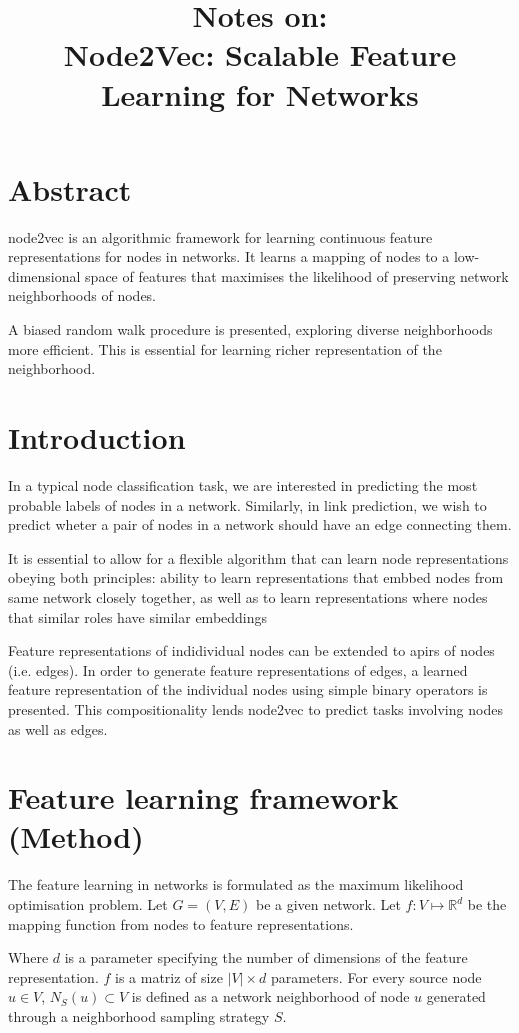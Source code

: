\documentclass{article}
\title{\textbf{Notes on:}\\ Node2Vec: Scalable Feature Learning for Networks}
\begin{document}
\maketitle{}

\section{Abstract}
node2vec is an algorithmic framework for learning continuous feature
representations for nodes in networks. It learns a mapping of nodes to a
low-dimensional space of features that maximises the likelihood of preserving
network neighborhoods of nodes.

A biased random walk procedure is presented, exploring diverse neighborhoods
more efficient. This is essential for learning richer representation of the
neighborhood.


\section{Introduction}
In a typical node classification task, we are interested in predicting the most
probable labels of nodes in a network. Similarly, in link prediction, we wish
to predict wheter a pair of nodes in a network should have an edge connecting
them.

It is essential to allow for a flexible algorithm that can learn node
representations obeying both principles: ability to learn representations that
embbed nodes from same network closely together, as well as to learn
representations where nodes that similar roles have similar embeddings

Feature representations of indidividual nodes can be extended to apirs of nodes
(i.e. edges). In order to generate feature representations of edges,  a learned
feature representation of the individual nodes using simple binary operators is
presented. This compositionality lends node2vec to predict tasks involving
nodes as well as edges.

\section{Feature learning framework (Method)}
The feature learning in networks is formulated as the maximum likelihood
optimisation problem. Let $G = (V,E)$ be a given network. Let $f : V \mapsto
\mathbb{R}^d$ be the mapping function from nodes to feature representations.

Where $d$ is a parameter specifying the number of dimensions of the feature
representation. $f$ is a matriz of size $\vert V \vert \times d$ parameters.
For every source node $u \in V$, $N_S (u) \subset V$  is defined as a network
neighborhood of node $u$ generated through a neighborhood sampling strategy $S$.
\end{document}
